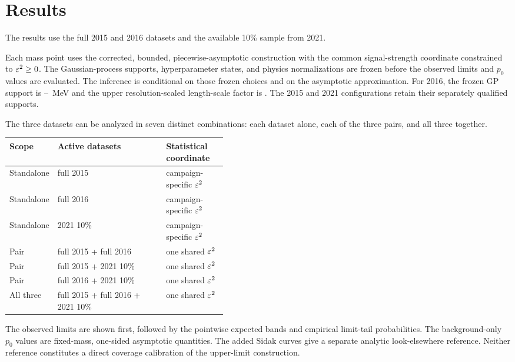 \section{Results}
\label{sec:selected-observed-results}


The results use the full 2015 and 2016 datasets and the available 10\%
sample from 2021.

Each mass point uses the corrected, bounded, piecewise-asymptotic \CLs{}
construction with the common signal-strength coordinate constrained to
$\varepsilon^2\geq 0$. The Gaussian-process supports, hyperparameter states, and physics
normalizations are frozen before the observed limits and $p_0$ values are evaluated.
The inference is conditional on those frozen choices and on
the asymptotic approximation. For 2016, the frozen GP support is
\FinalSixteenSupportLowMeV--\FinalSixteenSupportHighMeV~MeV and the upper
resolution-scaled length-scale factor is \FinalSixteenLengthScaleUpperFactor. The
2015 and 2021 configurations retain their separately qualified supports.

The three datasets can be analyzed in seven distinct combinations: each dataset
alone, each of the three pairs, and all three together.

\begin{center}
\small
\begin{tabularx}{\linewidth}{@{}P{0.15\linewidth}Y P{0.28\linewidth}@{}}
\toprule
Scope & Active datasets & Statistical coordinate \\
\midrule
Standalone & full 2015 & campaign-specific $\varepsilon^2$ \\
Standalone & full 2016 & campaign-specific $\varepsilon^2$ \\
Standalone & 2021 10\% & campaign-specific $\varepsilon^2$ \\
Pair & full 2015 + full 2016 & one shared $\varepsilon^2$ \\
Pair & full 2015 + 2021 10\% & one shared $\varepsilon^2$ \\
Pair & full 2016 + 2021 10\% & one shared $\varepsilon^2$ \\
All three & full 2015 + full 2016 + 2021 10\% & one shared $\varepsilon^2$ \\
\bottomrule
\end{tabularx}
\end{center}

The observed limits are shown first, followed by the pointwise expected
bands and empirical limit-tail probabilities. The background-only $p_0$ values are fixed-mass, one-sided asymptotic
quantities. The added Sidak curves give a separate analytic look-elsewhere
reference. Neither reference constitutes a direct coverage calibration of the
upper-limit construction.

